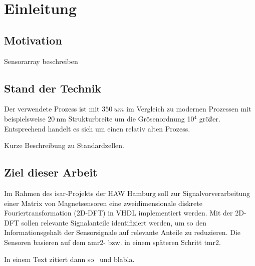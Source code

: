\chapter{Einleitung}
 \section{Motivation}
Sensorarray beschreiben

\section{Stand der Technik}
Der verwendete Prozess ist mit $\SI{350}{um}$ im Vergleich zu modernen Prozessen mit beispielsweise $\SI{20}{\nm}$ Strukturbreite um die Grösenordnung 10$^4$ größer. Entsprechend handelt es 
sich um einen relativ alten Prozess.

Kurze Beschreibung zu Standardzellen.


\section{Ziel dieser Arbeit}
Im Rahmen des \gls{isar}-Projekts der HAW Hamburg soll zur Signalvorverarbeitung einer Matrix von Magnetsensoren  eine 
zweidimensionale diskrete Fouriertransformation (2D-DFT) in VHDL implementiert werden. Mit der 
2D-DFT sollen relevante Signalanteile identifiziert werden, um so den Informationsgehalt der Sensorsignale auf relevante Anteile zu reduzieren. Die Sensoren basieren auf 
dem \gls{amr2}- bzw. in einem späteren Schritt \gls{tmr2}.

In einem Text zitiert dann so~\autocite[10-20]{krey2015systemarchitektur} und blabla.

